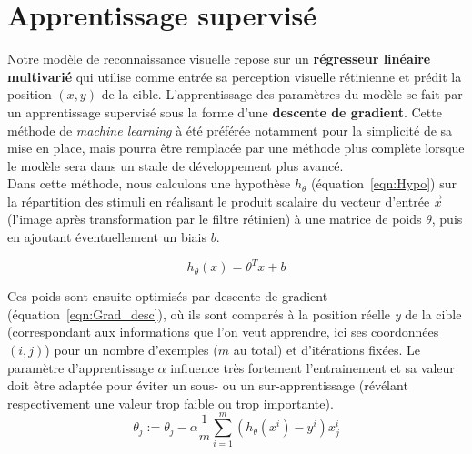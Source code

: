 
\section{Apprentissage supervisé} %

Notre modèle de reconnaissance visuelle repose sur un \textbf{régresseur linéaire multivarié} qui utilise comme entrée sa perception visuelle rétinienne et prédit la position $(x,y)$ de la cible. L'apprentissage des paramètres du modèle se fait par un apprentissage supervisé sous la forme d'une \textbf{descente de gradient}. Cette méthode de \textit{machine learning} à été préférée notamment pour la simplicité de sa mise en place, mais pourra être remplacée par une méthode plus complète lorsque le modèle sera dans un stade de développement plus avancé.\\
Dans cette méthode, nous calculons une hypothèse $h_{\theta}$ (équation~\ref{eqn:Hypo}) sur la répartition des stimuli en réalisant le produit scalaire du vecteur d'entrée $\overrightarrow{x}$ (l'image après transformation par le filtre rétinien) à une matrice de poids $\theta$, puis en ajoutant éventuellement un biais $b$.

\begin{equation}
h_{\theta}(x) = \theta^{T}x + b
\label{eqn:Hypo}
\end{equation}

Ces poids sont ensuite optimisés par descente de gradient (équation~\ref{eqn:Grad_desc}), où ils sont comparés à la position réelle \textit{y} de la cible (correspondant aux informations que l'on veut apprendre, ici ses coordonnées $(i,j)$) pour un nombre d'exemples ($m$ au total) et d'itérations fixées. Le paramètre d'apprentissage $\alpha$ influence très fortement l'entrainement et sa valeur doit être adaptée pour éviter un sous- ou un sur-apprentissage (révélant respectivement une valeur trop faible ou trop importante).\\

\begin{equation}
\theta_j := \theta_j - \alpha \frac{1}{m} \sum_{i=1}^m (h_\theta(x^i) - y^i)x_{j}^i
\label{eqn:Grad_desc}
\end{equation}

